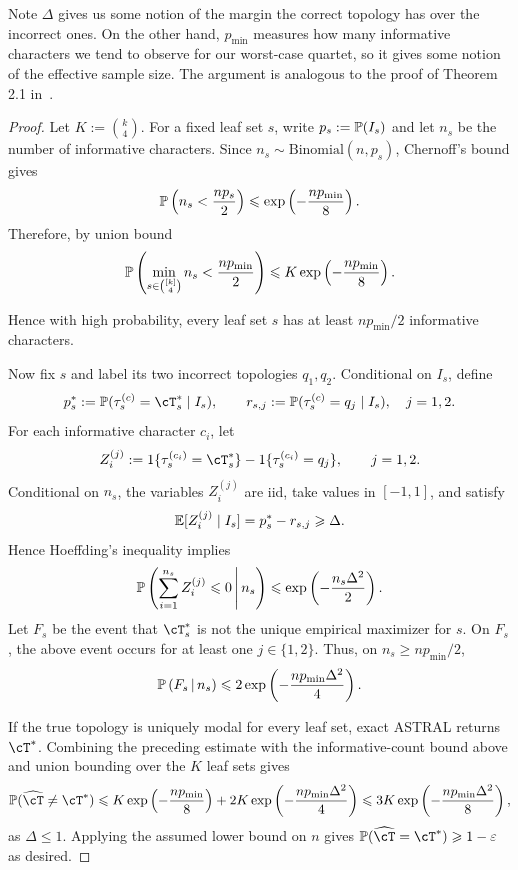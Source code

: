 Note $\Delta$ gives us some notion of the margin the correct topology has over the incorrect ones. On the other hand, $p_{\min}$
measures how many informative characters we tend to observe for our worst-case quartet, so it gives some notion of
the effective sample size. The argument is analogous to the proof of Theorem 2.1 in~\cite{shekhar2018_how_many_genes_are_enough}.

\begin{proof}
Let $K:=\binom{k}{4}$. For a fixed leaf set $s$, write
$p_s:=\P(I_s)$ and let $n_s$ be the number of informative characters. Since
$n_s\sim\mathrm{Binomial}(n,p_s)$, Chernoff's bound gives
\[
    \P\left(n_s<\frac{np_s}{2}\right)
    \leq \exp\left(-\frac{np_{\min}}{8}\right).
\]
Therefore, by union bound
\[
    \P\left(\min_{s\in {[k]\choose 4}}n_s<\frac{np_{\min}}{2}\right)
    \leq K\exp\left(-\frac{np_{\min}}{8}\right).
\]

\noindent Hence with high probability, every leaf set $s$ has at least
$np_{\min}/2$ informative characters.

Now fix $s$ and label its two incorrect topologies $q_1,q_2$. Conditional on
$I_s$, define
\[
    p_s^*:=\P(\tau_s^{(c)}=\cT_s^*\mid I_s),
    \qquad
    r_{s,j}:=\P(\tau_s^{(c)}=q_j\mid I_s),\quad j=1,2.
\]
For each informative character $c_i$, let
\[
    Z_i^{(j)}
    :=1\{\tau_s^{(c_i)}=\cT_s^*\}
    -1\{\tau_s^{(c_i)}=q_j\},\qquad j=1,2.
\]
Conditional on $n_s$, the variables $Z_i^{(j)}$ are iid, take values in
$[-1,1]$, and satisfy
\[
    \E[Z_i^{(j)}\mid I_s]=p_s^*-r_{s,j}\geq\Delta.
\]
Hence Hoeffding's inequality implies
\[
    \P\left(\sum_{i=1}^{n_s}Z_i^{(j)}\leq0\,\middle|\,n_s\right)
    \leq \exp\left(-\frac{n_s\Delta^2}{2}\right).
\]
Let $F_s$ be the event that $\cT_s^*$ is not the unique empirical maximizer for $s$.
On $F_s$, the above event occurs for at least one $j\in\{1,2\}$. Thus, on
$n_s\geq np_{\min}/2$,
\[
    \P\left(F_s\,\middle|\,n_s\right)
    \leq 2\exp\left(-\frac{np_{\min}\Delta^2}{4}\right).
\]

If the true topology is uniquely modal for every leaf set, exact ASTRAL returns
$\cT^*$. Combining the preceding estimate with the informative-count bound
above and union bounding over the $K$ leaf sets gives
\[
    \P(\widehat{\cT}\neq\cT^*)
    \leq K\exp\left(-\frac{np_{\min}}{8}\right)
    +2K\exp\left(-\frac{np_{\min}\Delta^2}{4}\right)
    \leq 3K\exp\left(-\frac{np_{\min}\Delta^2}{8}\right),
\]
as $\Delta\leq1$. Applying the assumed lower bound on $n$
gives $\P(\widehat{\cT}=\cT^*)\geq1-\varepsilon$ as desired.
\end{proof}

